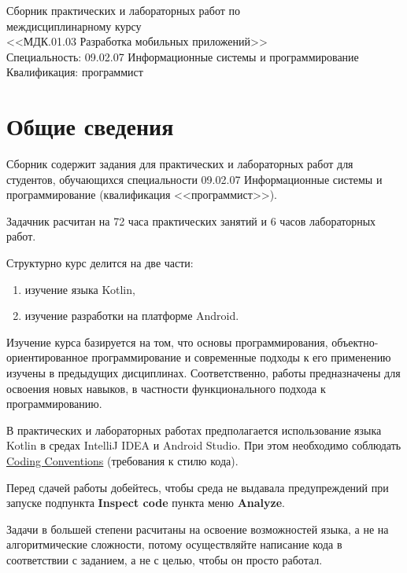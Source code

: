 \documentclass{article}
\begin{document}
{
	\thispagestyle{empty}
	\vspace*{\fill}
	\centering 

	\Large Сборник практических и лабораторных работ по \\
	междисциплинарному курсу \\
	<<МДК.01.03 Разработка мобильных приложений>>\\
	\large
	\vspace{40pt}
	Специальность: 09.02.07 Информационные системы и программирование\\
	Квалификация: программист
	\vspace*{\fill}
	\newpage
}

\tableofcontents
\newpage
\section{Общие сведения}

Сборник содержит задания для практических и лабораторных работ для студентов, 
обучающихся специальности 09.02.07 Информационные системы и программирование
(квалификация <<программист>>). 

Задачник расчитан на 72 часа практических занятий и 6 часов лабораторных работ.

Структурно курс делится на две части:

\begin{enumerate}
	\item изучение языка Kotlin,\\
	\item изучение разработки на платформе Android.
\end{enumerate}

Изучение курса базируется на том, что основы программирования, объектно-ориентированное программирование и современные 
подходы к его применению изучены в предыдущих дисциплинах. Соответственно, работы предназначены для освоения новых
навыков, в частности функционального подхода к программированию.

В практических и лабораторных работах предполагается использование языка Kotlin в средах
IntelliJ IDEA и Android Studio. При этом необходимо соблюдать 
\href{https://kotlinlang.org/docs/reference/coding-conventions.html}{Coding Conventions} (требования к стилю кода). 

Перед сдачей работы добейтесь, чтобы среда не выдавала предупреждений 
при запуске подпункта \textbf{Inspect code} пункта меню \textbf{Analyze}.

Задачи в большей степени расчитаны на освоение возможностей языка, а не
на алгоритмические сложности, потому
осуществляйте написание кода в соответствии с заданием, а не с целью, чтобы 
он просто работал.
\end{document}
